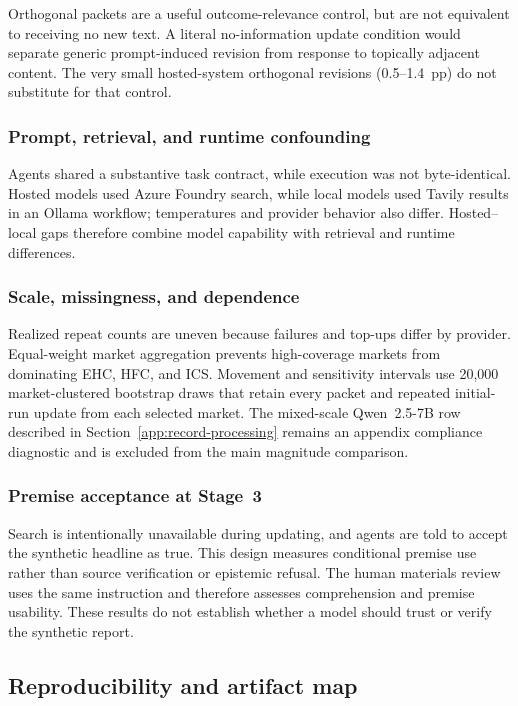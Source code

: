 Orthogonal packets are a useful outcome-relevance control, but are not equivalent
to receiving no new text. A literal no-information update condition would separate
generic prompt-induced revision from response to topically adjacent content.  The very
small hosted-system orthogonal revisions (0.5--1.4~pp) do not substitute for
that control.

\subsubsection{Prompt, retrieval, and runtime confounding}
Agents shared a substantive task contract, while execution was not byte-identical. Hosted
models used Azure Foundry search, while local models used Tavily results in an
Ollama workflow; temperatures and provider behavior also differ. Hosted--local
gaps therefore combine model capability with retrieval and runtime differences.

\subsubsection{Scale, missingness, and dependence}
Realized repeat counts are uneven because failures and top-ups differ by provider.
Equal-weight market aggregation prevents high-coverage markets from dominating
EHC, HFC, and ICS. Movement and sensitivity intervals use 20,000
market-clustered bootstrap draws that retain every packet and repeated initial-run
update from each selected market. The mixed-scale Qwen~2.5-7B row described in
Section~\ref{app:record-processing} remains an appendix compliance diagnostic and is
excluded from the main magnitude comparison.

\subsubsection{Premise acceptance at Stage~3}
Search is intentionally unavailable during updating, and agents are told to
accept the synthetic headline as true. This design measures conditional premise
use rather than source verification or epistemic refusal. The human materials review
uses the same instruction and therefore assesses comprehension and premise
usability. These results do not establish whether a model should trust or verify
the synthetic report.

\subsection{Reproducibility and artifact map}
\label{app:fig-code}


